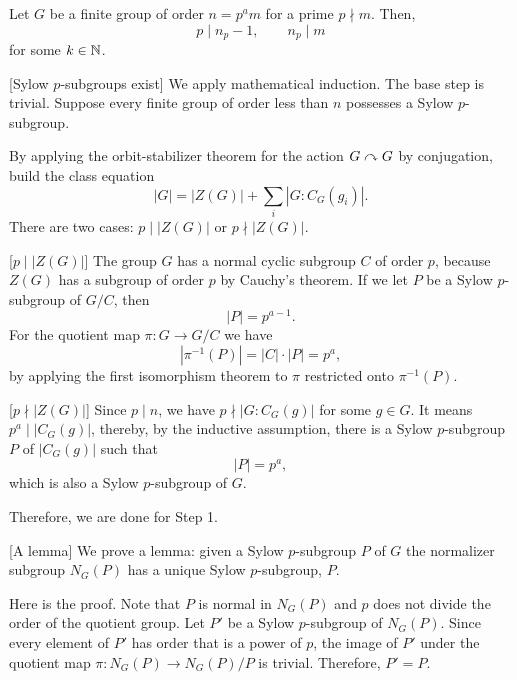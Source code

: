 \documentclass{../exp}
\begin{document}
\begin{thm}
Let $G$ be a finite group of order $n=p^am$ for a prime $p\nmid m$.
Then,
\[p\mid n_p-1,\qquad n_p\mid m\]
for some $k\in\mathbb{N}$.
\end{thm}
\begin{pf}
[Sylow $p$-subgroups exist]
We apply mathematical induction.
The base step is trivial.
Suppose every finite group of order less than $n$ possesses a Sylow $p$-subgroup.

By applying the orbit-stabilizer theorem for the action $G\curvearrowright G$ by conjugation, build the class equation
\[|G|=|Z(G)|+\sum_i|G:C_G(g_i)|.\]
There are two cases: $p\mid|Z(G)|$ or $p\nmid|Z(G)|$.

[$p\mid|Z(G)|$]
The group $G$ has a normal cyclic subgroup $C$ of order $p$, because $Z(G)$ has a subgroup of order $p$ by Cauchy's theorem.
If we let $P$ be a Sylow $p$-subgroup of $G/C$, then
\[|P|=p^{a-1}.\]
For the quotient map $\pi:G\to G/C$ we have
\[|\pi^{-1}(P)|=|C|\cdot|P|=p^a,\]
by applying the first isomorphism theorem to $\pi$ restricted onto $\pi^{-1}(P)$.

[$p\nmid|Z(G)|$]
Since $p\mid n$, we have $p\nmid|G:C_G(g)|$ for some $g\in G$.
It means $p^a\mid|C_G(g)|$, thereby, by the inductive assumption, there is a Sylow $p$-subgroup $P$ of $|C_G(g)|$ such that
\[|P|=p^a,\]
which is also a Sylow $p$-subgroup of $G$.

Therefore, we are done for Step 1.

\bigskip
{}[A lemma]
We prove a lemma: given a Sylow $p$-subgroup $P$ of $G$ the normalizer subgroup $N_G(P)$ has a unique Sylow $p$-subgroup, $P$.

Here is the proof.
Note that $P$ is normal in $N_G(P)$ and $p$ does not divide the order of the quotient group.
Let $P'$ be a Sylow $p$-subgroup of $N_G(P)$.
Since every element of $P'$ has order that is a power of $p$, the image of $P'$ under the quotient map $\pi:N_G(P)\to N_G(P)/P$ is trivial.
Therefore, $P'=P$.


\end{pf}
\end{document}
